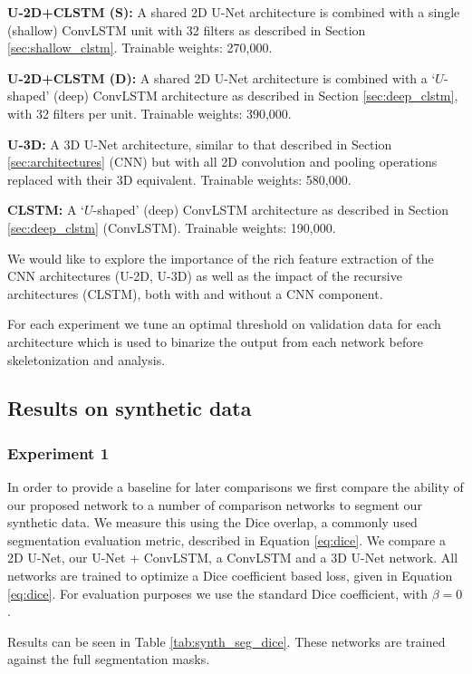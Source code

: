 \documentclass[journal,transmag]{IEEEtran}
\begin{document}
\textbf{U-2D+CLSTM (S): } A shared 2D U-Net architecture is combined with a single (shallow) ConvLSTM unit with 32 filters as described in Section \ref{sec:shallow_clstm}. Trainable weights: 270,000.

\textbf{U-2D+CLSTM (D): } A shared 2D U-Net architecture is combined with a `$U$-shaped' (deep) ConvLSTM architecture as described in Section \ref{sec:deep_clstm}, with 32 filters per unit. Trainable weights: 390,000.

\textbf{U-3D: } A 3D U-Net architecture, similar to that described in Section \ref{sec:architectures} (CNN) but with all 2D convolution and pooling operations replaced with their 3D equivalent. Trainable weights: 580,000.

\textbf{CLSTM: } A `$U$-shaped' (deep) ConvLSTM architecture as described in Section \ref{sec:deep_clstm} (ConvLSTM). Trainable weights: 190,000.

We would like to explore the importance of the rich feature extraction of the CNN architectures (U-2D, U-3D) as well as the impact of the recursive architectures (CLSTM), both with and without a CNN component.

For each experiment we tune an optimal threshold on validation data for each architecture which is used to binarize the output from each network before skeletonization and analysis.

\subsection{Results on synthetic data}

\subsubsection*{Experiment 1}
In order to provide a baseline for later comparisons we first compare the ability of our proposed network to a number of comparison networks to segment our synthetic data. We measure this using the Dice overlap, a commonly used segmentation evaluation metric, described in Equation \ref{eq:dice}. We compare a 2D U-Net, our U-Net + ConvLSTM, a ConvLSTM and a 3D U-Net network. All networks are trained to optimize a Dice coefficient based loss, given in Equation \ref{eq:dice}. For evaluation purposes we use the standard Dice coefficient, with $\beta = 0$.

Results can be seen in Table \ref{tab:synth_seg_dice}. These networks are trained against the full segmentation masks.
\end{document}
